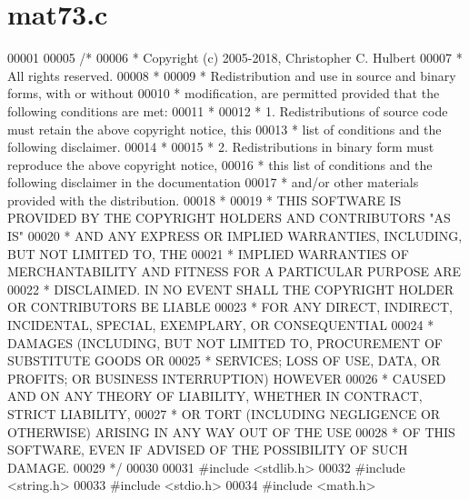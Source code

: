 \hypertarget{mat73_8c_source}{}\section{mat73.\+c}
\label{mat73_8c_source}

\begin{DoxyCode}
00001 
00005 \textcolor{comment}{/*}
00006 \textcolor{comment}{ * Copyright (c) 2005-2018, Christopher C. Hulbert}
00007 \textcolor{comment}{ * All rights reserved.}
00008 \textcolor{comment}{ *}
00009 \textcolor{comment}{ * Redistribution and use in source and binary forms, with or without}
00010 \textcolor{comment}{ * modification, are permitted provided that the following conditions are met:}
00011 \textcolor{comment}{ *}
00012 \textcolor{comment}{ * 1. Redistributions of source code must retain the above copyright notice, this}
00013 \textcolor{comment}{ *    list of conditions and the following disclaimer.}
00014 \textcolor{comment}{ *}
00015 \textcolor{comment}{ * 2. Redistributions in binary form must reproduce the above copyright notice,}
00016 \textcolor{comment}{ *    this list of conditions and the following disclaimer in the documentation}
00017 \textcolor{comment}{ *    and/or other materials provided with the distribution.}
00018 \textcolor{comment}{ *}
00019 \textcolor{comment}{ * THIS SOFTWARE IS PROVIDED BY THE COPYRIGHT HOLDERS AND CONTRIBUTORS "AS IS"}
00020 \textcolor{comment}{ * AND ANY EXPRESS OR IMPLIED WARRANTIES, INCLUDING, BUT NOT LIMITED TO, THE}
00021 \textcolor{comment}{ * IMPLIED WARRANTIES OF MERCHANTABILITY AND FITNESS FOR A PARTICULAR PURPOSE ARE}
00022 \textcolor{comment}{ * DISCLAIMED. IN NO EVENT SHALL THE COPYRIGHT HOLDER OR CONTRIBUTORS BE LIABLE}
00023 \textcolor{comment}{ * FOR ANY DIRECT, INDIRECT, INCIDENTAL, SPECIAL, EXEMPLARY, OR CONSEQUENTIAL}
00024 \textcolor{comment}{ * DAMAGES (INCLUDING, BUT NOT LIMITED TO, PROCUREMENT OF SUBSTITUTE GOODS OR}
00025 \textcolor{comment}{ * SERVICES; LOSS OF USE, DATA, OR PROFITS; OR BUSINESS INTERRUPTION) HOWEVER}
00026 \textcolor{comment}{ * CAUSED AND ON ANY THEORY OF LIABILITY, WHETHER IN CONTRACT, STRICT LIABILITY,}
00027 \textcolor{comment}{ * OR TORT (INCLUDING NEGLIGENCE OR OTHERWISE) ARISING IN ANY WAY OUT OF THE USE}
00028 \textcolor{comment}{ * OF THIS SOFTWARE, EVEN IF ADVISED OF THE POSSIBILITY OF SUCH DAMAGE.}
00029 \textcolor{comment}{ */}
00030 
00031 \textcolor{preprocessor}{#include <stdlib.h>}
00032 \textcolor{preprocessor}{#include <string.h>}
00033 \textcolor{preprocessor}{#include <stdio.h>}
00034 \textcolor{preprocessor}{#include <math.h>}

\end{DoxyCode}
